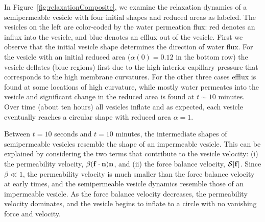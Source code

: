 \documentclass[9pt,twocolumn,twoside,lineno]{pnas-new}
\begin{document}
In Figure~\ref{fig:relaxationComposite}, we examine the relaxation
dynamics of a semipermeable vesicle with four initial shapes and reduced
areas as labeled. The vesicles on the left are color-coded by the water
permeation flux: red denotes an influx into the vesicle, and blue
denotes an efflux out of the vesicle.
%
First we observe that the initial vesicle shape determines the direction
of water flux. For the vesicle with an initial reduced area
($\alpha(0)=0.12$ in the bottom row) the vesicle deflates (blue regions)
first due to the high interior capillary pressure that corresponds to
the high membrane curvatures. For the other three cases efflux is found
at some locations of high curvature, while mostly water permeates into
the vesicle and significant change in the reduced area is found at
$t\sim 10$ minutes. Over time (about ten hours) all vesicles inflate and
as expected, each vesicle eventually reaches a circular shape with
reduced area $\alpha=1$. 
%
%

Between $t=10$ seconds and $t=10$ minutes, the intermediate shapes of
semipermeable vesicles resemble the shape of an impermeable vesicle.
This can be explained by considering the two terms that contribute to
the vesicle velocity: (i) the permeability velocity, $\beta(\mathbf{f} \cdot
\mathbf{n}) \mathbf{n}$, and (ii) the force balance velocity, $\mathcal{S}[\mathbf{f}]$. Since
$\beta\ll 1$, the permeability velocity is much smaller than the force
balance velocity at early times, and the semipermeable vesicle dynamics
resemble those of an impermeable vesicle. As the force balance velocity
decreases, the permeability velocity dominates, and the vesicle begins
to inflate to a circle with no vanishing force and velocity. 


\end{document}
